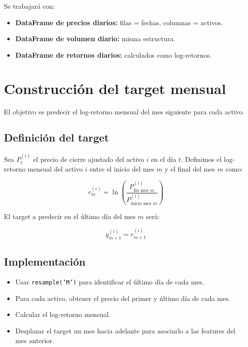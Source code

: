 \documentclass[12pt]{article}
\begin{document}
Se trabajará con:

\begin{itemize}
    \item \textbf{DataFrame de precios diarios:} filas = fechas, columnas = activos.
    \item \textbf{DataFrame de volumen diario:} misma estructura.
    \item \textbf{DataFrame de retornos diarios:} calculados como log-retornos.
\end{itemize}

\section{Construcción del target mensual}

El objetivo es predecir el log-retorno mensual del mes siguiente para cada activo.

\subsection{Definición del target}

Sea $P_{t}^{(i)}$ el precio de cierre ajustado del activo $i$ en el día $t$.  
Definimos el log-retorno mensual del activo $i$ entre el inicio del mes $m$ y el final del mes $m$ como:



\[
r_{m}^{(i)} = \ln\left(\frac{P_{\text{fin mes } m}^{(i)}}{P_{\text{inicio mes } m}^{(i)}}\right)
\]



El target a predecir en el último día del mes $m$ será:



\[
y_{m+1}^{(i)} = r_{m+1}^{(i)}
\]



\subsection{Implementación}

\begin{itemize}
    \item Usar \texttt{resample('M')} para identificar el último día de cada mes.
    \item Para cada activo, obtener el precio del primer y último día de cada mes.
    \item Calcular el log-retorno mensual.
    \item Desplazar el target un mes hacia adelante para asociarlo a las features del mes anterior.
\end{itemize}
\end{document}
